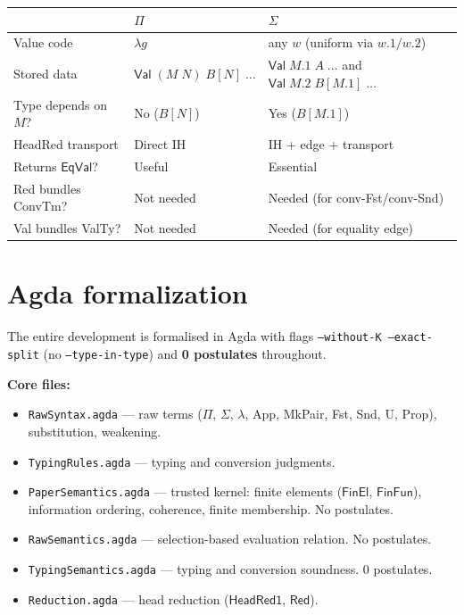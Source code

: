 \documentclass[11pt]{article}
\newcommand{\App}[2]{#1\;#2}
\newcommand{\substone}[2]{#1[#2]}
\newcommand{\Val}{\mathsf{Val}}
\newcommand{\EqVal}{\mathsf{EqVal}}
\newcommand{\pj}[2]{#1\mbox{.}#2}
\begin{document}
\begin{center}
\begin{tabular}{l|l|l}
  & $\Pi$ & $\Sigma$ \\
\hline
Value code & $\lambda g$ & any $w$ (uniform via $\pj{w}{1}/\pj{w}{2}$) \\
Stored data & $\Val\;(\App{M}{N})\;\substone{B}{N}\;\ldots$ & $\Val\;\pj{M}{1}\;A\;\ldots$
  and $\Val\;\pj{M}{2}\;\substone{B}{\pj{M}{1}}\;\ldots$ \\
Type depends on $M$? & No ($\substone{B}{N}$) & Yes ($\substone{B}{\pj{M}{1}}$) \\
HeadRed transport & Direct IH & IH + edge + transport \\
Returns $\EqVal$? & Useful & Essential \\
Red bundles ConvTm? & Not needed & Needed (for conv-Fst/conv-Snd) \\
Val bundles ValTy? & Not needed & Needed (for equality edge) \\
\end{tabular}
\end{center}

\section{Agda formalization}

The entire development is formalised in Agda with flags
\texttt{--without-K --exact-split} (no \texttt{--type-in-type}) and
\textbf{0 postulates} throughout.

\medskip\noindent\textbf{Core files:}
\begin{itemize}
  \item \texttt{RawSyntax.agda} --- raw terms ($\Pi$, $\Sigma$,
    $\lambda$, App, MkPair, Fst, Snd, U, Prop), substitution,
    weakening.
  \item \texttt{TypingRules.agda} --- typing and conversion judgments.
  \item \texttt{PaperSemantics.agda} --- trusted kernel: finite
    elements ($\mathsf{FinEl}$, $\mathsf{FinFun}$), information
    ordering, coherence, finite membership.  No postulates.
  \item \texttt{RawSemantics.agda} --- selection-based evaluation
    relation.  No postulates.
  \item \texttt{TypingSemantics.agda} --- typing and conversion
    soundness.  0 postulates.
  \item \texttt{Reduction.agda} --- head reduction
    ($\mathsf{HeadRed1}$, $\mathsf{Red}$).
\end{itemize}
\end{document}
